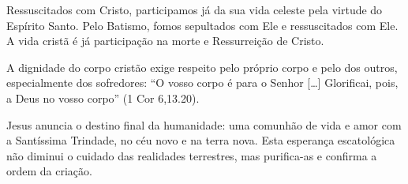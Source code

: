 Ressuscitados com Cristo, participamos já da sua vida celeste pela virtude do Espírito Santo. Pelo Batismo, fomos sepultados com Ele e ressuscitados com Ele. A vida cristã é já participação na morte e Ressurreição de Cristo.

A dignidade do corpo cristão exige respeito pelo próprio corpo e pelo dos outros, especialmente dos sofredores: ``O vosso corpo é para o Senhor [\ldots] Glorificai, pois, a Deus no vosso corpo'' (1 Cor 6,13.20).

Jesus anuncia o destino final da humanidade: uma comunhão de vida e amor com a Santíssima Trindade, no céu novo e na terra nova. Esta esperança escatológica não diminui o cuidado das realidades terrestres, mas purifica-as e confirma a ordem da criação.
